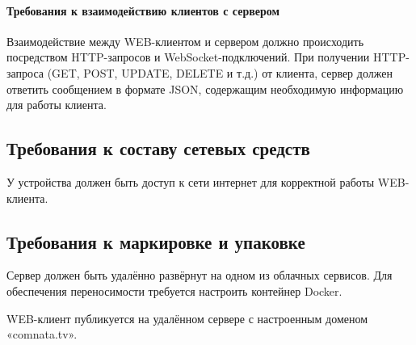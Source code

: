 \paragraph{Требования к взаимодействию клиентов с сервером}
Взаимодействие между WEB-клиентом и сервером должно происходить посредством HTTP-запросов и WebSocket-подключений.
При получении HTTP-запроса (GET, POST, UPDATE, DELETE и т.д.) от клиента, сервер должен ответить сообщением в формате
JSON, содержащим необходимую информацию для работы клиента.

\subsection{Требования к составу сетевых средств}

У устройства должен быть доступ к сети интернет для корректной работы WEB-клиента.

\subsection{Требования к маркировке и упаковке}

Сервер должен быть удалённо развёрнут на одном из облачных сервисов.
Для обеспечения переносимости требуется настроить контейнер Docker.

WEB-клиент публикуется на удалённом сервере с настроенным доменом «comnata.tv».